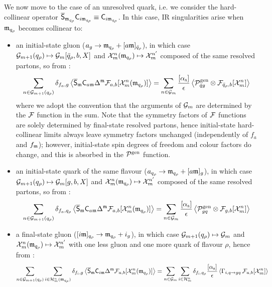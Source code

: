 We now move to the case of an unresolved quark, i.e. we consider the hard-collinear operator $ \overline{\mathsf{S}}_{\mathfrak{m}_{q_\rho}} \mathsf{C}_{i\mathfrak{m}_{q_\rho}} \equiv \mathsf{C}_{i\mathfrak{m}_{q_\rho}} $. In this case, IR singularities arise when $ \mathfrak{m}_{q_\rho} $ becomes collinear to:
\begin{itemize}
  \item an initial-state gluon ($ a_g \rightarrow \mathfrak{m}_{q_\rho} + [a\mathfrak{m}]_{\bar{q}_\rho} $), in which case $ \mathcal{G}_{m+1}(q_\rho) \mapsto \mathcal{G}_m[\bar{q}_\rho , b , X] $ and $ \mathcal{X}^{n}_{m}(\mathfrak{m}_{q_\rho}) \mapsto \mathcal{X}^{n'}_{m} $ composed of the same resolved partons, so from :
  \begin{equation*}
    \sum_{n \in \mathcal{G}_{m+1}(q_\rho)} \delta_{f_a , g} \left\langle \overline{\mathsf{S}}_{\mathfrak{m}} \mathsf{C}_{a\mathfrak{m}} \Delta^{\mathfrak{m}} \mathcal{F}_{a,b}[\mathcal{X}^{n}_{m}(\mathfrak{m}_{q_\rho})] \right\rangle = \sum_{n \in \mathcal{G}_m} \frac{[\alpha_\text{s}]}{\epsilon} \left\langle \mathcal{P}^\text{gen}_{\bar{q} g} \otimes \mathcal{F}_{\bar{q}_\rho , b}[\mathcal{X}^{n}_{m}] \right\rangle
  \end{equation*}
  where we adopt the convention that the arguments of $ \mathcal{G}_m $ are determined by the $ \mathcal{F} $ function in the sum. Note that the symmetry factors of $ \mathcal{F} $ functions are solely determined by final-state resolved partons, hence initial-state hard-collinear limits always leave symmetry factors unchanged (independently of $ f_a $ and $ f_{\mathfrak{m}} $); however, initial-state spin degrees of freedom and colour factors do change, and this is absorbed in the $ \mathcal{P}^\text{gen} $ function.
  \item an initial-state quark of the same flavour ($ a_{q_\rho} \rightarrow \mathfrak{m}_{q_\rho} + [a\mathfrak{m}]_g $), in which case $ \mathcal{G}_{m+1}(q_\rho) \mapsto \mathcal{G}_m[g,b,X] $ and $ \mathcal{X}^{n}_{m}(\mathfrak{m}_{q_\rho}) \mapsto \mathcal{X}^{n'}_{m} $ composed of the same resolved partons, so from :
  \begin{equation*}
    \sum_{n \in \mathcal{G}_{m+1}(q_\rho)} \delta_{f_a , q_\rho} \left\langle \overline{\mathsf{S}}_{\mathfrak{m}} \mathsf{C}_{a\mathfrak{m}} \Delta^{\mathfrak{m}} \mathcal{F}_{a,b}[\mathcal{X}^{n}_{m}(\mathfrak{m}_{q_\rho})] \right\rangle = \sum_{n \in \mathcal{G}_m} \frac{[\alpha_\text{s}]}{\epsilon} \left\langle \mathcal{P}^\text{gen}_{gq} \otimes \mathcal{F}_{g,b}[\mathcal{X}^{n}_{m}] \right\rangle
  \end{equation*}
  \item a final-state gluon ($ [i\mathfrak{m}]_{q_\rho} \rightarrow \mathfrak{m}_{q_\rho} + i_g $), in which case $ \mathcal{G}_{m+1} (q_\rho) \mapsto \mathcal{G}_{m} $ and $ \mathcal{X}^{n}_{m}(\mathfrak{m}_{q_\rho}) \mapsto \mathcal{X}^{n'}_{m} $ with one less gluon and one more quark of flavour $ \rho $, hence from :
  \begin{equation*}
    \sum_{n \in \en_{m+1}(q_\rho)} \sum_{i \in \fsu{n}{m}(\ur_{q_\rho})} \delta_{f_i , g} \ips{\oso_\ur \co_{i\ur} \Delta^\ur \flm_{a,b}[\fs{n}{m}(\ur_{q_\rho})]} = \sum_{n \in \en_m} \sum_{i \in \fsu{n}{m}} \delta_{f_i , q_\rho} \frac{[\rc]}{\de} \ips{\Gamma_{i , q \rightarrow gq} \,\flm_{a,b}[\fs{n}{m}]}

\end{equation*}
\end{itemize}
